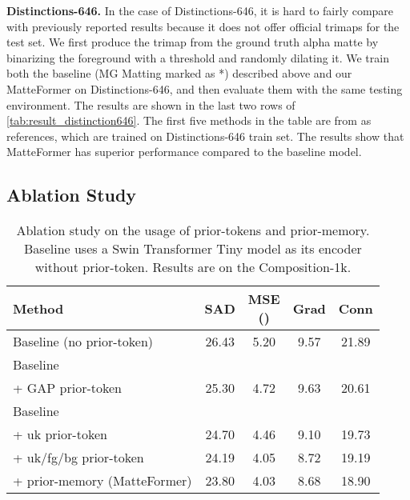 \documentclass[10pt,twocolumn,letterpaper]{article}
\begin{document}
\textbf{Distinctions-646.}
In the case of Distinctions-646, it is hard to fairly compare with previously reported results because it does not offer official trimaps for the test set.
We first produce the trimap from the ground truth alpha matte by binarizing the foreground with a threshold and randomly dilating it.
We train both the baseline (MG Matting marked as *) described above and our MatteFormer on Distinctions-646, and then evaluate them with the same testing environment. The results are shown in the last two rows of \cref{tab:result_distinction646}.
The first five methods in the table are from\cite{qiao2020attention} as references, which are trained on Distinctions-646 train set.
The results show that MatteFormer has superior performance compared to the baseline model.

\subsection{Ablation Study}



\begin{table}[t!]
  \centering
   \begin{adjustbox}{width = \linewidth}
  \begin{tabular}{l | c c c c}
    \toprule
    Method & SAD & \makecell{MSE \\ ()} & Grad & Conn\\
    \midrule
    Baseline (no prior-token) & 26.43 & 5.20 & 9.57 & 21.89 \\
    \hline
    Baseline & & & & \\
    + GAP prior-token  & 25.30 & 4.72 & 9.63 & 20.61 \\
    \hline
    Baseline & & & & \\
    + uk prior-token  & 24.70 & 4.46 & 9.10 & 19.73 \\
    + uk/fg/bg prior-token & 24.19 & 4.05 & 8.72 & 19.19 \\
    + prior-memory (MatteFormer) & 23.80 & 4.03 & 8.68 & 18.90 \\
    \bottomrule
  \end{tabular}
  \end{adjustbox}
  \caption{Ablation study on the usage of prior-tokens and prior-memory. Baseline uses a Swin Transformer Tiny model as its encoder without prior-token. Results are on the Composition-1k.}
  \label{tab:ablation}
  \vspace{-2mm}
\end{table}
\end{document}
